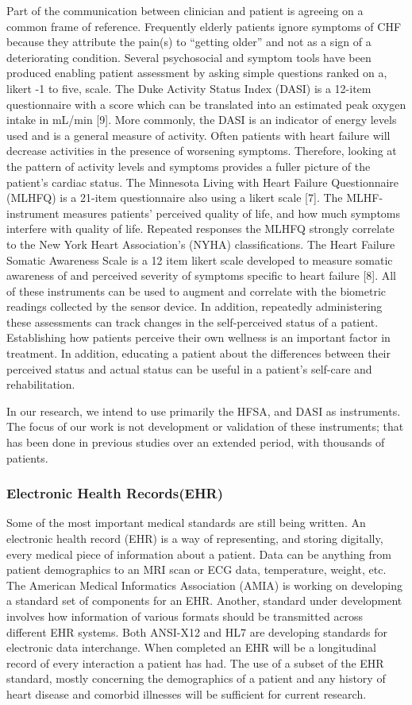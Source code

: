 Part of the communication between clinician and patient is agreeing on a common frame of reference.  Frequently elderly patients ignore symptoms of CHF because they attribute the pain(s) to “getting older” and not as a sign of a deteriorating condition. Several psychosocial and symptom tools have been produced enabling patient assessment by asking simple questions ranked on a, likert -1 to five, scale. The Duke Activity Status Index (DASI) is a 12-item questionnaire with a score which can be translated into an estimated peak oxygen intake in mL/min [9]. More commonly, the DASI is an indicator of energy levels used and is a general measure of activity.  Often patients with heart failure will decrease activities in the presence of worsening symptoms. Therefore, looking at the pattern of activity levels and symptoms provides a fuller picture of the patient's cardiac status. The Minnesota Living with Heart Failure Questionnaire (MLHFQ) is a 21-item questionnaire also using a likert scale [7]. The MLHF-instrument measures patients' perceived quality of life, and how much symptoms interfere with quality of life. Repeated responses the MLHFQ strongly correlate to the New York Heart Association’s (NYHA) classifications. The Heart Failure Somatic Awareness Scale is a 12 item likert scale developed to measure somatic awareness of and perceived severity of symptoms specific to heart failure [8]. All of these instruments can be used to augment and correlate with the biometric readings collected by the sensor device. In addition, repeatedly administering these assessments can track changes in the self-perceived status of a patient. Establishing how patients perceive their own wellness is an important factor in treatment. In addition, educating a patient about the differences between their perceived status and actual status can be useful in a patient’s self-care and rehabilitation.

In our research, we intend to use primarily the HFSA, and DASI as instruments. The focus of our work is not development or validation of these instruments; that has been done in previous studies over an extended period, with thousands of patients.

\subsubsection{Electronic Health Records(EHR)}
Some of the most important medical standards are still being written. An electronic health record (EHR) is a way of representing, and storing digitally, every medical piece of information about a patient. Data can be anything from patient demographics to an MRI scan or ECG data, temperature, weight, etc. The American Medical Informatics Association (AMIA) is working on developing a standard set of components for an EHR. Another, standard under development involves how information of various formats should be transmitted across different EHR systems. Both ANSI-X12 and HL7 are developing standards for electronic data interchange. When completed an EHR will be a longitudinal record of every interaction a patient has had. The use of a subset of the EHR standard, mostly concerning the demographics of a patient and any history of heart disease and comorbid illnesses will be sufficient for current research.


